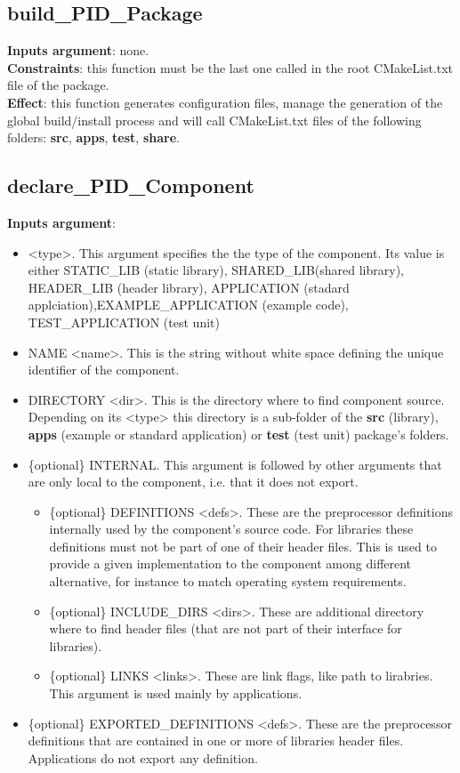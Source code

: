 \documentclass[12pt,a4paper]{article}
\begin{document}
\subsection{build\_PID\_Package}
\textbf{Inputs argument}: none.\\
\textbf{Constraints}: this function must be the last one called in the root CMakeList.txt file of the package.\\
\textbf{Effect}: this function generates configuration files, manage the generation of the global build/install process and will call CMakeList.txt files of the following folders: \textbf{src}, \textbf{apps}, \textbf{test}, \textbf{share}.

\subsection{declare\_PID\_Component}
\textbf{Inputs argument}:
\begin{itemize}
\item <type>. This argument specifies the the type of the component. Its value is either STATIC\_LIB (static library), SHARED\_LIB(shared library), HEADER\_LIB (header library), APPLICATION (stadard applciation),EXAMPLE\_APPLICATION (example code), TEST\_APPLICATION (test unit)
\item NAME <name>. This is the string without white space defining the unique identifier of the component.
\item DIRECTORY <dir>. This is the directory where to find component source. Depending on its <type> this directory is a sub-folder of the \textbf{src} (library), \textbf{apps} (example or standard application) or \textbf{test} (test unit) package's folders.
\item \{optional\} INTERNAL. This argument is followed by other arguments that are only local to the component, i.e. that it does not export.
\begin{itemize}
\item \{optional\} DEFINITIONS <defs>. These are the preprocessor definitions internally used by the component's source code. For libraries these definitions must not be part of one of their header files. This is used to provide a given implementation to the component among different alternative, for instance to match operating system requirements.
\item \{optional\} INCLUDE\_DIRS <dirs>. These are additional directory where to find header files (that are not part of their interface for libraries).
\item \{optional\} LINKS <links>. These are link flags, like path to lirabries. This argument is used mainly by applications.
\end{itemize}
\item \{optional\} EXPORTED\_DEFINITIONS <defs>. These are the preprocessor definitions that are contained in one or more of libraries header files. Applications do not export any definition.
\end{itemize}
\end{document}
